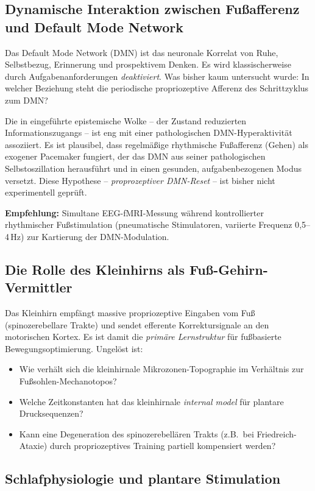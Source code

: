 ﻿\documentclass[12pt,a4paper]{report}
\theoremstyle{plain}
\theoremstyle{definition}
\theoremstyle{remark}
\begin{document}
\subsection{Dynamische Interaktion zwischen Fußafferenz und Default Mode Network}

Das Default Mode Network (DMN) ist das neuronale Korrelat von
Ruhe, Selbstbezug, Erinnerung und prospektivem Denken. Es wird
klassischerweise durch Aufgabenanforderungen \emph{deaktiviert}.
Was bisher kaum untersucht wurde: In welcher Beziehung steht die
periodische propriozeptive Afferenz des Schrittzyklus zum DMN?

Die in \cite{epp2026brn} eingeführte epistemische Wolke -- der
Zustand reduzierten Informationszugangs -- ist eng mit einer
pathologischen DMN-Hyperaktivität assoziiert. Es ist plausibel,
dass regelmäßige rhythmische Fußafferenz (Gehen) als exogener
Pacemaker fungiert, der das DMN aus seiner pathologischen
Selbstoszillation herausführt und in einen gesunden, aufgabenbezogenen
Modus versetzt. Diese Hypothese -- \emph{proprozeptiver DMN-Reset} --
ist bisher nicht experimentell geprüft.

\textbf{Empfehlung:} Simultane EEG-fMRI-Messung während
kontrollierter rhythmischer Fußstimulation (pneumatische Stimulatoren,
variierte Frequenz 0{,}5--4\,Hz) zur Kartierung der DMN-Modulation.

\subsection{Die Rolle des Kleinhirns als Fuß-Gehirn-Vermittler}

Das Kleinhirn empfängt massive propriozeptive Eingaben vom Fuß
(spinozerebellare Trakte) und sendet efferente Korrektursignale an
den motorischen Kortex. Es ist damit die \emph{primäre Lernstruktur}
für fußbasierte Bewegungsoptimierung. Ungelöst ist:

\begin{itemize}
\item Wie verhält sich die kleinhirnale Mikrozonen-Topographie im
  Verhältnis zur Fußsohlen-Mechanotopos?
\item Welche Zeitkonstanten hat das kleinhirnale \emph{internal model}
  für plantare Drucksequenzen?
\item Kann eine Degeneration des spinozerebellären Trakts (z.B.\ bei
  Friedreich-Ataxie) durch propriozeptives Training partiell kompensiert
  werden?
\end{itemize}

\subsection{Schlafphysiologie und plantare Stimulation}
\end{document}
